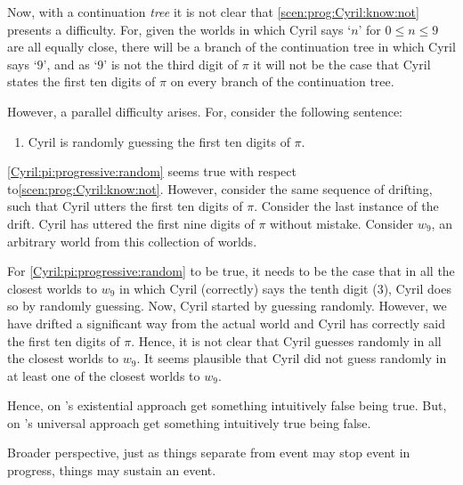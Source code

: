 \begin{note}
  Now, with a continuation \emph{tree} it is not clear that \autoref{scen:prog:Cyril:know:not} presents a difficulty.
  For, given the worlds in which Cyril says `\(n\)' for \(0 \leq n \leq 9\) are all equally close, there will be a branch of the continuation tree in which Cyril says `\(9\)', and as `\(9\)' is not the third digit of \(\pi\) it will not be the case that Cyril states the first ten digits of \(\pi\) on every branch of the continuation tree.

  However, a parallel difficulty arises.
  For, consider the following sentence:
  \begin{enumerate}
  \item
    \label{Cyril:pi:progressive:random}
    Cyril is randomly guessing the first ten digits of \(\pi\).
  \end{enumerate}
  \ref{Cyril:pi:progressive:random} seems true with respect to\autoref{scen:prog:Cyril:know:not}.
  However, consider the same sequence of drifting, such that Cyril utters the first ten digits of \(\pi\).
  Consider the last instance of the drift.
  Cyril has uttered the first nine digits of \(\pi\) without mistake.
  Consider \(w_{9}\), an arbitrary world from this collection of worlds.

  For \ref{Cyril:pi:progressive:random} to be true, it needs to be the case that in all the closest worlds to \(w_{9}\) in which Cyril (correctly) says the tenth digit (\(3\)), Cyril does so by randomly guessing.
  Now, Cyril started by guessing randomly.
  However, we have drifted a significant way from the actual world and Cyril has correctly said the first ten digits of \(\pi\).
  Hence, it is not clear that Cyril guesses randomly in all the closest worlds to \(w_{9}\).
  It seems plausible that Cyril did not guess randomly in at least one of the closest worlds to \(w_{9}\).

  Hence, on \citeauthor{Landman:1992wh}'s existential approach get something intuitively false being true.
  But, on \citeauthor{Szabo:2004ul}'s universal approach get something intuitively true being false.

  Broader perspective, just as things separate from event may stop event in progress, things may sustain an event.
\end{note}

